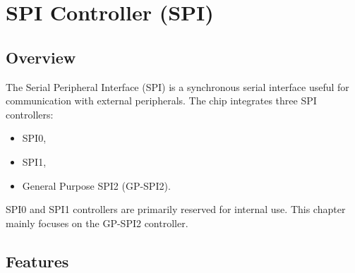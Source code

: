 \documentclass[main\_\_EN.tex]{subfiles}
\begin{document}

\ifglobal
\else
    {\let\clearpage\relax \listoftodos}
    \tableofcontents
\fi


\hypertarget{spi}{}
\chapter{SPI Controller (SPI)}
\label{mod:spi}


\section{Overview}

The Serial Peripheral Interface (SPI) is a synchronous serial interface useful for communication with external peripherals.
The \chipname{} chip integrates three SPI controllers:
\begin{itemize}
  \item SPI0,
  \item SPI1,
  \item General Purpose SPI2 (GP-SPI2).
\end{itemize}

SPI0 and SPI1 controllers are primarily reserved for internal use. This chapter mainly focuses on the GP-SPI2 controller.



\section{Features}
\end{document}
